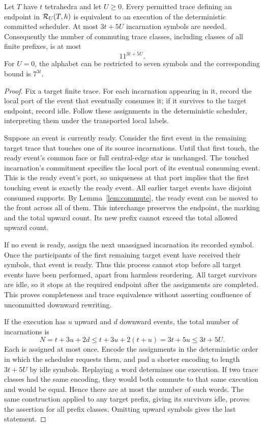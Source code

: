 \begin{theorem}\label{thm:commitment}
Let $T$ have $t$ tetrahedra and let $U\ge0$. Every permitted trace defining
an endpoint in $\mathcal R_U(T,h)$ is equivalent to an execution of the
deterministic committed scheduler.
At most $3t+5U$ incarnation symbols are needed. Consequently the number of
commuting trace classes, including classes of all finite prefixes, is at most
\begin{equation}\label{eq:commitment-count}
 11^{3t+5U}.
\end{equation}
For $U=0$, the alphabet can be restricted to seven symbols and the corresponding
bound is $7^{3t}$.
\end{theorem}
\begin{proof}
Fix a target finite trace. For each incarnation appearing in it, record the
local port of the event that eventually consumes it; if it survives to the
target endpoint, record idle. Follow these assignments in the deterministic
scheduler, interpreting them under the transported local labels.

Suppose an event is currently ready. Consider the first event in the
remaining target trace that touches one of its source incarnations. Until
that first touch, the ready event's common face or full central-edge star is
unchanged. The touched incarnation's commitment specifies the local port of
its eventual consuming event. This is the ready event's port, so uniqueness
at that port implies that the first touching event is exactly the ready
event. All earlier target events have disjoint consumed supports. By
Lemma~\ref{lem:commute}, the ready event can be moved to the front across all
of them. This interchange preserves the endpoint, the marking and the total
upward count. Its new prefix cannot exceed the total allowed upward count.

If no event is ready, assign the next unassigned incarnation its recorded
symbol. Once the participants of the first remaining target event have
received their symbols, that event is ready. Thus this process cannot stop
before all target events have been performed, apart from harmless
reordering. All target survivors are idle, so it stops at the required
endpoint after the assignments are completed. This proves completeness and
trace equivalence without asserting confluence of uncommitted downward
rewriting.

If the execution has $u$ upward and $d$ downward events, the total number of
incarnations is
\[
 N=t+3u+2d\le t+3u+2(t+u)=3t+5u\le3t+5U.
\]
Each is assigned at most once. Encode the assignments in the deterministic
order in which the scheduler requests them, and pad a shorter encoding to
length $3t+5U$ by idle symbols. Replaying a word determines one execution.
If two trace classes had the same encoding, they would both commute to
that same execution and would be equal. Hence there are at most the number
of such words. The same construction applied to any target prefix, giving
its survivors idle, proves the assertion for all prefix classes. Omitting
upward symbols gives the last statement.
\end{proof}

